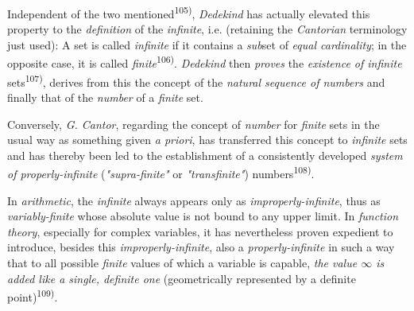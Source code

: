 \thispagestyle{fancy}

\vspace{0.5cm}

Independent of the two mentioned\textsuperscript{105)}, \textit{Dedekind} has actually elevated this property to the \textit{definition} of the \textit{infinite}, i.e. (retaining the \textit{Cantorian} terminology just used): A set is called \textit{infinite} if it contains a \textit{sub}set of \textit{equal cardinality}; in the opposite case, it is called \textit{finite}\textsuperscript{106)}. \textit{Dedekind} then \textit{proves} the \textit{existence of infinite} sets\textsuperscript{107)}, derives from this the concept of the \textit{natural sequence of numbers} and finally that of the \textit{number} of a \textit{finite} set.

Conversely, \textit{G. Cantor}, regarding the concept of \textit{number} for \textit{finite} sets in the usual way as something given \textit{a priori}, has transferred this concept to \textit{infinite} sets and has thereby been led to the establishment of a consistently developed \textit{system of properly-infinite} (\textit{"supra-finite"} or \textit{"transfinite"}) numbers\textsuperscript{108)}.

In \textit{arithmetic}, the \textit{infinite} always appears only as \textit{improperly-infinite}, thus as \textit{variably-finite} whose absolute value is not bound to any upper limit. In \textit{function theory}, especially for complex variables, it has nevertheless proven expedient to introduce, besides this \textit{improperly-infinite}, also a \textit{properly-infinite} in such a way that to all possible \textit{finite} values of which a variable is capable, \textit{the value $\infty$ is added like a single, definite one} (geometrically represented by a definite point)\textsuperscript{109)}.

